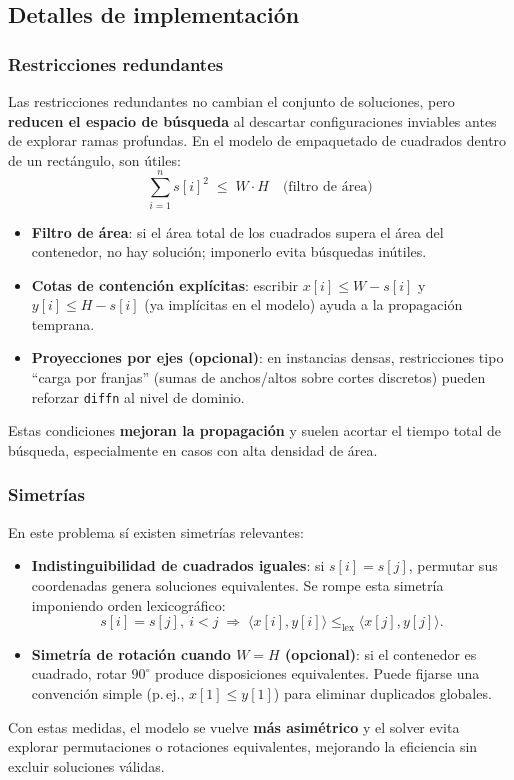 
\subsection{Detalles de implementación}\label{sec:06-rectangulo-impl}
\subsubsection*{Restricciones redundantes}
Las restricciones redundantes no cambian el conjunto de soluciones, pero \textbf{reducen el espacio de búsqueda} al descartar configuraciones inviables antes de explorar ramas profundas.  
En el modelo de empaquetado de cuadrados dentro de un rectángulo, son útiles:
\[
\sum_{i=1}^{n} s[i]^2 \;\le\; W\cdot H
\quad\text{(filtro de área)}
\]
\begin{itemize}
  \item \textbf{Filtro de área}: si el área total de los cuadrados supera el área del contenedor, no hay solución; imponerlo evita búsquedas inútiles.
  \item \textbf{Cotas de contención explícitas}: escribir \(x[i]\le W-s[i]\) y \(y[i]\le H-s[i]\) (ya implícitas en el modelo) ayuda a la propagación temprana.
  \item \textbf{Proyecciones por ejes (opcional)}: en instancias densas, restricciones tipo “carga por franjas” (sumas de anchos/altos sobre cortes discretos) pueden reforzar \texttt{diffn} al nivel de dominio.
\end{itemize}
Estas condiciones \textbf{mejoran la propagación} y suelen acortar el tiempo total de búsqueda, especialmente en casos con alta densidad de área.

\subsubsection*{Simetrías}
En este problema sí existen simetrías relevantes:
\begin{itemize}
  \item \textbf{Indistinguibilidad de cuadrados iguales}: si \(s[i]=s[j]\), permutar sus coordenadas genera soluciones equivalentes. Se rompe esta simetría imponiendo orden lexicográfico:
  \[
  s[i]=s[j],\ i<j \;\Rightarrow\; \langle x[i],y[i]\rangle \le_{\text{lex}} \langle x[j],y[j]\rangle.
  \]
  \item \textbf{Simetría de rotación cuando \(W=H\) (opcional)}: si el contenedor es cuadrado, rotar \(90^\circ\) produce disposiciones equivalentes. Puede fijarse una convención simple (p.\,ej., \(x[1]\le y[1]\)) para eliminar duplicados globales.
\end{itemize}
Con estas medidas, el modelo se vuelve \textbf{más asimétrico} y el solver evita explorar permutaciones o rotaciones equivalentes, mejorando la eficiencia sin excluir soluciones válidas.

